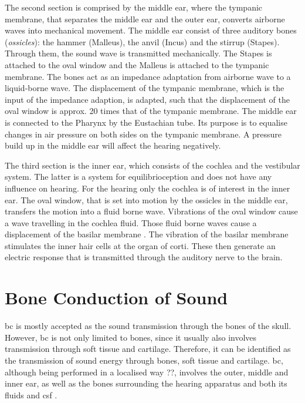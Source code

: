 The second section is comprised by the middle ear, where the tympanic membrane, that separates the middle ear and the outer ear, converts airborne waves into mechanical movement. The middle ear consist of three auditory bones (\textit{ossicles}): the hammer (Malleus), the anvil (Incus) and the stirrup (Stapes). Through them, the sound wave is transmitted mechanically. The Stapes is attached to the oval window and the Malleus is attached to the tympanic membrane. The bones act as an impedance adaptation from airborne wave to a liquid-borne wave. The displacement of the tympanic membrane, which is the input of the impedance adaption, is adapted, such that the displacement of the oval window is approx. 20 times that of the tympanic membrane. The middle ear is connected to the Pharynx by the Eustachian tube. Its purpose is to equalise changes in air pressure on both sides on the tympanic membrane. A pressure build up in the middle ear will affect the hearing negatively. %

The third section is the inner ear, which consists of the cochlea and the vestibular system. The latter is a system for equilibrioception and does not have any influence on hearing. For the hearing only the cochlea is of interest in the inner ear. The oval window, that is set into motion by the ossicles in the middle ear, transfers the motion into a fluid borne wave. Vibrations of the oval window cause a wave travelling in the cochlea fluid. Those fluid borne waves cause a displacement of the basilar membrane \citep{ho_2017}. The vibration of the basilar membrane stimulates the inner hair cells at the organ of corti. These then generate an electric response that is transmitted through the auditory nerve to the brain.



\section{Bone Conduction of Sound}\label{sec:bonepaths}
\gls{bc} is mostly accepted as the sound transmission through the bones of the skull. However, \gls{bc} is not only limited to bones, since it usually also involves transmission through soft tissue and cartilage. Therefore, it can be identified as the transmission of sound energy through bones, soft tissue and cartilage. 
\gls{bc}, although being performed in a localised way ??, involves the outer, middle and inner ear, as well as the bones surrounding the hearing apparatus and both its fluids and \gls{csf} \citep{puria_2013}.
 
